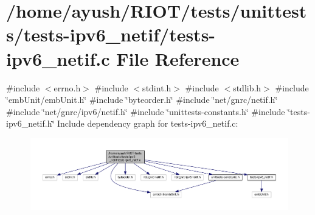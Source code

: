 \hypertarget{tests-ipv6__netif_8c}{}\section{/home/ayush/\+R\+I\+O\+T/tests/unittests/tests-\/ipv6\+\_\+netif/tests-\/ipv6\+\_\+netif.c File Reference}
\label{tests-ipv6__netif_8c}
{\ttfamily \#include $<$errno.\+h$>$}\newline
{\ttfamily \#include $<$stdint.\+h$>$}\newline
{\ttfamily \#include $<$stdlib.\+h$>$}\newline
{\ttfamily \#include \char`\"{}emb\+Unit/emb\+Unit.\+h\char`\"{}}\newline
{\ttfamily \#include \char`\"{}byteorder.\+h\char`\"{}}\newline
{\ttfamily \#include \char`\"{}net/gnrc/netif.\+h\char`\"{}}\newline
{\ttfamily \#include \char`\"{}net/gnrc/ipv6/netif.\+h\char`\"{}}\newline
{\ttfamily \#include \char`\"{}unittests-\/constants.\+h\char`\"{}}\newline
{\ttfamily \#include \char`\"{}tests-\/ipv6\+\_\+netif.\+h\char`\"{}}\newline
Include dependency graph for tests-\/ipv6\+\_\+netif.c\+:
\nopagebreak
\begin{figure}[H]
\begin{center}
\leavevmode
\includegraphics[width=350pt]{tests-ipv6__netif_8c__incl}
\end{center}
\end{figure}
